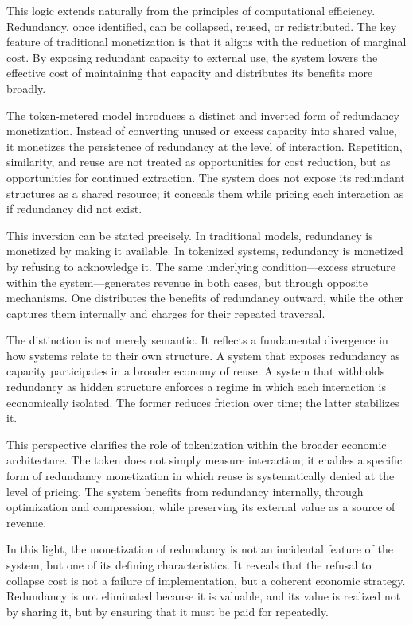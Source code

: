 \documentclass[12pt, oneside]{article}
\begin{document}
This logic extends naturally from the principles of computational efficiency. Redundancy, once identified, can be collapsed, reused, or redistributed. The key feature of traditional monetization is that it aligns with the reduction of marginal cost. By exposing redundant capacity to external use, the system lowers the effective cost of maintaining that capacity and distributes its benefits more broadly.

The token-metered model introduces a distinct and inverted form of redundancy monetization. Instead of converting unused or excess capacity into shared value, it monetizes the persistence of redundancy at the level of interaction. Repetition, similarity, and reuse are not treated as opportunities for cost reduction, but as opportunities for continued extraction. The system does not expose its redundant structures as a shared resource; it conceals them while pricing each interaction as if redundancy did not exist.

This inversion can be stated precisely. In traditional models, redundancy is monetized by making it available. In tokenized systems, redundancy is monetized by refusing to acknowledge it. The same underlying condition—excess structure within the system—generates revenue in both cases, but through opposite mechanisms. One distributes the benefits of redundancy outward, while the other captures them internally and charges for their repeated traversal.

The distinction is not merely semantic. It reflects a fundamental divergence in how systems relate to their own structure. A system that exposes redundancy as capacity participates in a broader economy of reuse. A system that withholds redundancy as hidden structure enforces a regime in which each interaction is economically isolated. The former reduces friction over time; the latter stabilizes it.

This perspective clarifies the role of tokenization within the broader economic architecture. The token does not simply measure interaction; it enables a specific form of redundancy monetization in which reuse is systematically denied at the level of pricing. The system benefits from redundancy internally, through optimization and compression, while preserving its external value as a source of revenue.

In this light, the monetization of redundancy is not an incidental feature of the system, but one of its defining characteristics. It reveals that the refusal to collapse cost is not a failure of implementation, but a coherent economic strategy. Redundancy is not eliminated because it is valuable, and its value is realized not by sharing it, but by ensuring that it must be paid for repeatedly.
\end{document}
